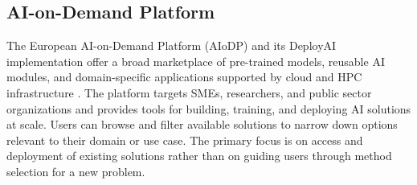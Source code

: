 \subsection{AI-on-Demand Platform}
The European AI-on-Demand Platform (AIoDP) and its 
DeployAI implementation offer a broad marketplace of 
pre-trained models, reusable AI modules, and 
domain-specific applications supported by cloud 
and HPC infrastructure 
\parencite{troumpoukis2025deployai_ai_on_demand_platform}. 
The platform targets SMEs, researchers, and public 
sector organizations and provides tools for building, 
training, and deploying AI solutions at scale. 
Users can browse and filter available solutions 
to narrow down options relevant to their domain 
or use case. The primary focus is on access and 
deployment of existing solutions rather than on 
guiding users through method selection for a 
new problem.